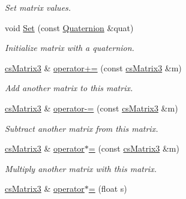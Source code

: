 \begin{DoxyCompactItemize}
\begin{DoxyCompactList}\small\item\em Set matrix values. \end{DoxyCompactList}\item 
void \hyperlink{classcsMatrix3_a76cdcc1451201ef8d80c5373d44e1f92}{Set} (const \hyperlink{structQuaternion}{Quaternion} \&quat)\hypertarget{classcsMatrix3_a76cdcc1451201ef8d80c5373d44e1f92}{}\label{classcsMatrix3_a76cdcc1451201ef8d80c5373d44e1f92}

\begin{DoxyCompactList}\small\item\em Initialize matrix with a quaternion. \end{DoxyCompactList}\item 
\hyperlink{classcsMatrix3}{cs\+Matrix3} \& \hyperlink{classcsMatrix3_a483b113b1a46fc7a20fcb27007dddc79}{operator+=} (const \hyperlink{classcsMatrix3}{cs\+Matrix3} \&m)\hypertarget{classcsMatrix3_a483b113b1a46fc7a20fcb27007dddc79}{}\label{classcsMatrix3_a483b113b1a46fc7a20fcb27007dddc79}

\begin{DoxyCompactList}\small\item\em Add another matrix to this matrix. \end{DoxyCompactList}\item 
\hyperlink{classcsMatrix3}{cs\+Matrix3} \& \hyperlink{classcsMatrix3_a4bc48155f056c99de9accc24f80bdfd8}{operator-\/=} (const \hyperlink{classcsMatrix3}{cs\+Matrix3} \&m)\hypertarget{classcsMatrix3_a4bc48155f056c99de9accc24f80bdfd8}{}\label{classcsMatrix3_a4bc48155f056c99de9accc24f80bdfd8}

\begin{DoxyCompactList}\small\item\em Subtract another matrix from this matrix. \end{DoxyCompactList}\item 
\hyperlink{classcsMatrix3}{cs\+Matrix3} \& \hyperlink{classcsMatrix3_a67c725c1afc15d2e56e5966a28f8edac}{operator$\ast$=} (const \hyperlink{classcsMatrix3}{cs\+Matrix3} \&m)\hypertarget{classcsMatrix3_a67c725c1afc15d2e56e5966a28f8edac}{}\label{classcsMatrix3_a67c725c1afc15d2e56e5966a28f8edac}

\begin{DoxyCompactList}\small\item\em Multiply another matrix with this matrix. \end{DoxyCompactList}\item 
\hyperlink{classcsMatrix3}{cs\+Matrix3} \& \hyperlink{classcsMatrix3_a0fd5670d3aa7a31f2b0c6fbc528e106d}{operator$\ast$=} (float s)\hypertarget{classcsMatrix3_a0fd5670d3aa7a31f2b0c6fbc528e106d}{}\label{classcsMatrix3_a0fd5670d3aa7a31f2b0c6fbc528e106d}


\end{DoxyCompactItemize}
